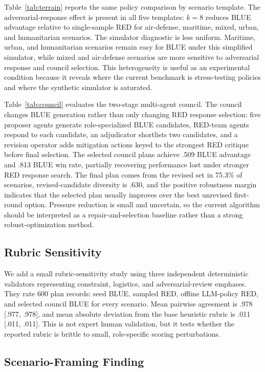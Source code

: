 \documentclass[letterpaper]{article} %
\begin{document}
Table~\ref{tab:terrain} reports the same policy comparison by scenario template. The adversarial-response effect is present in all five templates: $k=8$ reduces BLUE advantage relative to single-sample RED for air-defense, maritime, mixed, urban, and humanitarian scenarios. The simulator diagnostic is less uniform. Maritime, urban, and humanitarian scenarios remain easy for BLUE under this simplified simulator, while mixed and air-defense scenarios are more sensitive to adversarial response and council selection. This heterogeneity is useful as an experimental condition because it reveals where the current benchmark is stress-testing policies and where the synthetic simulator is saturated.

Table~\ref{tab:council} evaluates the two-stage multi-agent council. The council changes BLUE generation rather than only changing RED response selection: five proposer agents generate role-specialized BLUE candidates, RED-team agents respond to each candidate, an adjudicator shortlists two candidates, and a revision operator adds mitigation actions keyed to the strongest RED critique before final selection. The selected council plans achieve .509 BLUE advantage and .813 BLUE win rate, partially recovering performance lost under stronger RED response search. The final plan comes from the revised set in 75.3\% of scenarios, revised-candidate diversity is .630, and the positive robustness margin indicates that the selected plan usually improves over the best unrevised first-round option. Pressure reduction is small and uncertain, so the current algorithm should be interpreted as a repair-and-selection baseline rather than a strong robust-optimization method.

\subsection{Rubric Sensitivity}

We add a small rubric-sensitivity study using three independent deterministic validators representing constraint, logistics, and adversarial-review emphases. They rate 600 plan records: seed BLUE, sampled RED, offline LLM-policy RED, and selected council BLUE for every scenario. Mean pairwise agreement is .978 [.977, .978], and mean absolute deviation from the base heuristic rubric is .011 [.011, .011]. This is not expert human validation, but it tests whether the reported rubric is brittle to small, role-specific scoring perturbations.

\subsection{Scenario-Framing Finding}
\end{document}
